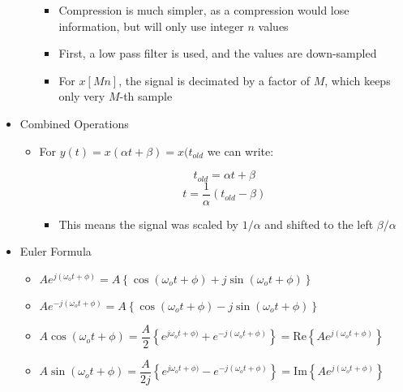 \begin{itemize}
\begin{itemize}
\begin{itemize}
          \item Compression is much simpler, as a compression would lose information, but will only use integer $n$ values

          \item First, a low pass filter is used, and the values are down-sampled

          \item For $x[Mn]$, the signal is decimated by a factor of $M$, which keeps only very $M$-th sample

        \end{itemize}

    \end{itemize}

  \item Combined Operations

    \begin{itemize}

      \item For $y(t)=x(\alpha t + \beta)=x(t_{old}$ we can write:

          $$t_{old}=\alpha t + \beta$$
          $$t=\frac{1}{\alpha}\left( t_{old}-\beta \right)$$

          \begin{itemize}

            \item This means the signal was scaled by $1/\alpha$ and shifted to the left $\beta/\alpha$

          \end{itemize}

    \end{itemize}

  \item Euler Formula

    \begin{itemize}

      \item $Ae^{j(\omega_o t+\phi)}=A\left\{ \cos(\omega_o t+\phi)+j\sin(\omega_o t+\phi) \right\}$

      \item $Ae^{-j(\omega_o t+\phi)}=A\left\{ \cos(\omega_o t+\phi)-j\sin(\omega_o t+\phi) \right\}$

      \item $A\cos(\omega_o t+\phi)=\dfrac{A}{2}\left\{ e^{j\omega_o t+\phi)}+e^{-j(\omega_o t+\phi)} \right\}=\text{Re}\left\{ Ae^{j(\omega_o t+\phi)} \right\}$

      \item $A\sin(\omega_o t+\phi)=\dfrac{A}{2j}\left\{ e^{j\omega_o t+\phi)}-e^{-j(\omega_o t+\phi)} \right\}=\text{Im}\left\{ Ae^{j(\omega_o t+\phi)} \right\}$

    \end{itemize}

\end{itemize}



